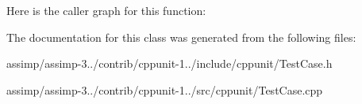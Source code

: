 Here is the caller graph for this function\+:




The documentation for this class was generated from the following files\+:\begin{DoxyCompactItemize}
\item 
assimp/assimp-\/3../contrib/cppunit-\/1../include/cppunit/Test\+Case.\+h\item 
assimp/assimp-\/3../contrib/cppunit-\/1../src/cppunit/Test\+Case.\+cpp\end{DoxyCompactItemize}
